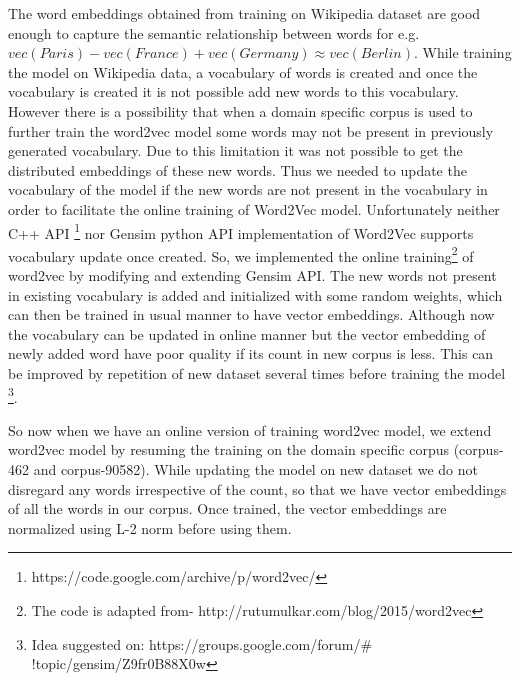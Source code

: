 The word embeddings obtained from training on Wikipedia dataset are good enough to capture the semantic relationship between words for e.g. $vec(Paris) -vec(France) + vec(Germany) \approx vec(Berlin)$. While training the model on Wikipedia data, a vocabulary of words is created and once the vocabulary is created it is not possible add new words to this vocabulary. However there is a possibility that when a domain specific corpus is used to further train the word2vec model some words may not be present in previously generated vocabulary. Due to this limitation it was not possible to get the distributed embeddings of these new words. Thus we needed to update the vocabulary of the model if the new words are not present in the vocabulary in order to facilitate the online training of Word2Vec model. Unfortunately neither C++ API \footnote{https://code.google.com/archive/p/word2vec/} nor Gensim python API \cite{w2v:gensim_api} implementation of Word2Vec supports vocabulary update once created. So, we implemented the online training\footnote{The code is adapted from-  http://rutumulkar.com/blog/2015/word2vec} of word2vec by modifying and extending Gensim API. The new words not present in existing vocabulary is added and initialized with some random weights, which can then be trained in usual manner to have vector embeddings. Although now the vocabulary can be updated in online manner but the vector embedding of newly added word have poor quality if its count in new corpus is less. This can be improved by repetition of new dataset several times before training the model \footnote{Idea suggested on: https://groups.google.com/forum/$\#$!topic/gensim/Z9fr0B88X0w}.

So now when we have an online version of training word2vec model, we extend word2vec model by resuming the training on the domain specific corpus (corpus-462 and corpus-90582). While updating the model on new dataset we do not disregard any words irrespective of the count, so that we have vector embeddings of all the words in our corpus. Once trained, the vector embeddings are normalized using L-2 norm before using them. 

